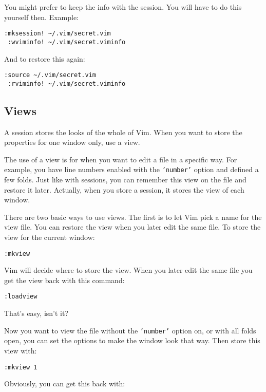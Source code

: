 You might prefer to keep the info with the session.
You will have to do this yourself then.
Example:

\begin{Verbatim}[samepage=true]
 :mksession! ~/.vim/secret.vim
 :wviminfo! ~/.vim/secret.viminfo
\end{Verbatim}

And to restore this again:

\begin{Verbatim}[samepage=true]
 :source ~/.vim/secret.vim
 :rviminfo! ~/.vim/secret.viminfo
\end{Verbatim}
\subsection{Views}
A session stores the looks of the whole of Vim.
When you want to store the properties for one window only, use a view.

The use of a view is for when you want to edit a file in a specific way.
For example, you have line numbers enabled with the \texttt{'number'} option and defined a few folds.
Just like with sessions, you can remember this view on the file and restore it later.
Actually, when you store a session, it stores the view of each window.

There are two basic ways to use views.
The first is to let Vim pick a name for the view file.
You can restore the view when you later edit the same file.
To store the view for the current window:

\begin{Verbatim}[samepage=true]
 :mkview
\end{Verbatim}

Vim will decide where to store the view.
When you later edit the same file you get the view back with this command:

\begin{Verbatim}[samepage=true]
 :loadview
\end{Verbatim}

That's easy, isn't it?

Now you want to view the file without the \texttt{'number'} option on, or with all folds open, you can set the options to make the window look that way.
Then store this view with:

\begin{Verbatim}[samepage=true]
 :mkview 1
\end{Verbatim}

Obviously, you can get this back with:

